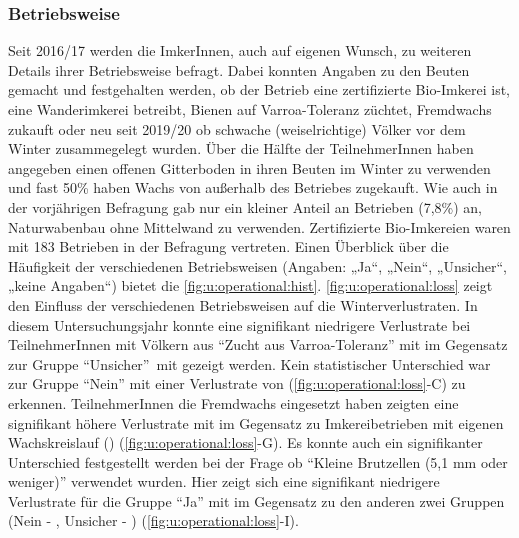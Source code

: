 \subsubsection{Betriebsweise}
\label{ss:betriebsweise:U}

Seit 2016/17 werden die ImkerInnen, auch auf eigenen Wunsch, zu weiteren Details ihrer Betriebsweise befragt. Dabei konnten Angaben zu den Beuten gemacht und festgehalten werden, ob der Betrieb eine zertifizierte Bio-Imkerei ist, eine Wanderimkerei betreibt, Bienen auf Varroa-Toleranz züchtet, Fremdwachs zukauft oder neu seit 2019/20 ob schwache (weiselrichtige) Völker vor dem Winter zusammegelegt wurden.
\newline
Über die Hälfte der TeilnehmerInnen haben angegeben einen offenen Gitterboden in ihren Beuten im Winter zu verwenden und fast 50\% haben Wachs von außerhalb des Betriebes zugekauft. Wie auch in der vorjährigen Befragung gab nur ein kleiner Anteil an Betrieben (7,8\%) an, Naturwabenbau ohne Mittelwand zu verwenden. Zertifizierte Bio-Imkereien waren mit 183 Betrieben in der Befragung vertreten. Einen Überblick über die Häufigkeit der verschiedenen Betriebsweisen (Angaben: „Ja``, „Nein``, „Unsicher``, „keine Angaben``) bietet die \cref{fig:u:operational:hist}. 
\newline
\cref{fig:u:operational:loss} zeigt den Einfluss der verschiedenen Betriebsweisen auf die Winterverlustraten. In diesem Untersuchungsjahr konnte eine signifikant niedrigere Verlustrate bei TeilnehmerInnen mit Völkern aus \enquote{Zucht aus Varroa-Toleranz} mit  im Gegensatz zur Gruppe \enquote{Unsicher} mit  gezeigt werden. Kein statistischer Unterschied war zur Gruppe \enquote{Nein} mit einer Verlustrate von  (\cref{fig:u:operational:loss}-C) zu erkennen. TeilnehmerInnen die Fremdwachs eingesetzt haben zeigten eine signifikant höhere Verlustrate mit  im Gegensatz zu Imkereibetrieben mit eigenen Wachskreislauf () (\cref{fig:u:operational:loss}-G). Es konnte auch ein signifikanter Unterschied festgestellt werden bei der Frage ob \enquote{Kleine Brutzellen (5,1 mm oder weniger)} verwendet wurden. Hier zeigt sich eine signifikant niedrigere Verlustrate für die Gruppe \enquote{Ja} mit  im Gegensatz zu den anderen zwei Gruppen (Nein - , Unsicher - ) (\cref{fig:u:operational:loss}-I).
\newline
